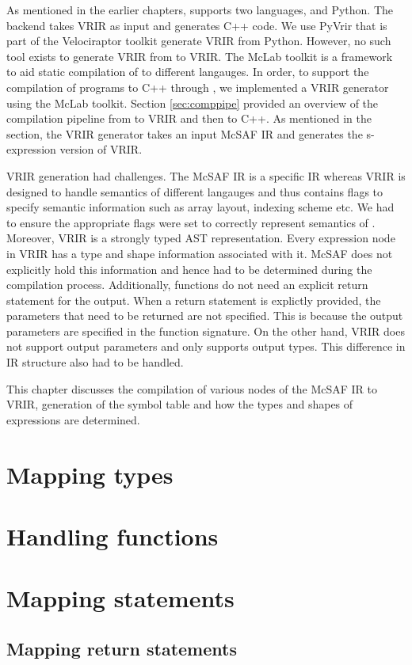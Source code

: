 As mentioned in the earlier chapters, \velocty supports two languages, \matlab and Python. The \velocty backend takes VRIR as input and generates C++ code. We use PyVrir that is part of the Velociraptor toolkit generate VRIR from Python. However, no such tool exists to generate VRIR from \matlab to VRIR. The McLab toolkit is a framework to aid static compilation of \matlab to different langauges. In order, to support the compilation of \matlab programs to C++ through \velocty, we implemented a VRIR generator using the McLab toolkit. Section \ref{sec:comppipe} provided an overview of the compilation pipeline from \matlab to VRIR and then to C++. As mentioned in the section, the VRIR generator takes an input McSAF IR and generates the s-expression version of VRIR.

VRIR generation had challenges. The McSAF IR is a \matlab specific IR whereas VRIR is designed to handle semantics of different langauges and thus contains flags to specify semantic information such as array layout, indexing scheme etc. We had to ensure the appropriate flags were set to correctly represent semantics of \matlab. Moreover, VRIR is a strongly typed AST representation. Every expression node in VRIR has a type  and shape information associated with it. McSAF does not explicitly hold this information and hence had to be determined during the compilation process. Additionally, \matlab functions do not need an explicit return statement for the output. When a return statement is explictly provided, the parameters that need to be returned are not specified. This is because the output parameters are specified in the function signature. On the other hand, VRIR does not support output parameters and only supports output types. This difference in IR structure also had to be handled.

This chapter discusses the compilation of various nodes of the McSAF IR to VRIR, generation of the symbol table and how the types and shapes of expressions are determined.
\section{Mapping types}
\section{Handling functions}
\section{Mapping statements}
\subsection{Mapping return statements}
